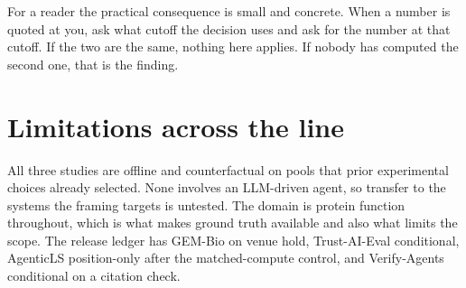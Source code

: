 \documentclass[11pt]{article}
\begin{document}
For a reader the practical consequence is small and concrete. When a number is quoted at you, ask what cutoff
the decision uses and ask for the number at that cutoff. If the two are the same, nothing here applies. If
nobody has computed the second one, that is the finding.

\section*{Limitations across the line}

All three studies are offline and counterfactual on pools that prior experimental choices already selected.
None involves an LLM-driven agent, so transfer to the systems the framing targets is untested. The domain is
protein function throughout, which is what makes ground truth available and also what limits the scope. The
release ledger has GEM-Bio on venue hold, Trust-AI-Eval conditional, AgenticLS position-only after the
matched-compute control, and Verify-Agents conditional on a citation check.
\end{document}
